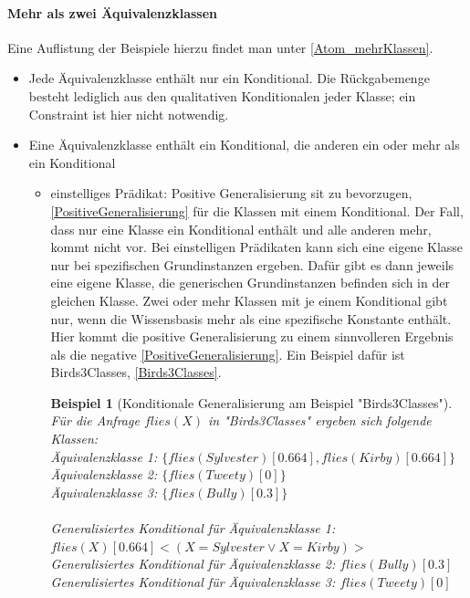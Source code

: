 \documentclass[a4paper, 11pt]{book}
\newtheorem{Bsp}{Beispiel}[section]
\begin{document}
\paragraph{ Mehr als zwei Äquivalenzklassen} 
Eine Auflistung der Beispiele hierzu findet man unter \ref{Atom_mehrKlassen}.\\
\begin{itemize}
	\item Jede Äquivalenzklasse enthält nur ein Konditional. Die Rückgabemenge besteht lediglich aus den qualitativen Konditionalen jeder Klasse; ein Constraint ist hier nicht notwendig.
	\item Eine Äquivalenzklasse enthält ein Konditional, die anderen ein oder mehr als ein Konditional
	\begin{itemize}
		\item einstelliges Prädikat: Positive Generalisierung sit zu bevorzugen, \ref{PositiveGeneralisierung} für die Klassen mit einem Konditional. Der Fall, dass nur eine Klasse ein Konditional enthält und alle anderen mehr, kommt nicht vor. Bei einstelligen Prädikaten kann sich eine eigene Klasse nur bei spezifischen Grundinstanzen ergeben. Dafür gibt es dann jeweils eine eigene Klasse, die generischen Grundinstanzen befinden sich in der gleichen Klasse. Zwei oder mehr Klassen mit je einem Konditional gibt nur, wenn die Wissensbasis mehr als eine spezifische Konstante enthält. Hier kommt die positive Generalisierung zu einem sinnvolleren Ergebnis als die negative \ref{PositiveGeneralisierung}. Ein Beispiel dafür ist Birds3Classes, \ref{Birds3Classes}.\\
		\begin{Bsp}[Konditionale Generalisierung am Beispiel "{}Birds3Classes"{}]
		Für die Anfrage $ flies(X) $ in "{}Birds3Classes"{} ergeben sich folgende Klassen:\\
		
		\noindent
		Äquivalenzklasse 1: $ \{flies(Sylvester)[0.664], flies(Kirby)[0.664]\}  $\\
		Äquivalenzklasse 2: $ \{flies(Tweety)[0]\} $\\
		Äquivalenzklasse 3: $ \{flies(Bully)[0.3]\} $\\
		\\
		Generalisiertes Konditional für Äquivalenzklasse 1: $ flies(X)[0.664]<(X = Sylvester \lor  X = Kirby)>$\\
		Generalisiertes Konditional für Äquivalenzklasse 2: $ flies(Bully)[0.3] $
		Generalisiertes Konditional für Äquivalenzklasse 3: $ flies(Tweety)[0] $\\
	

\end{Bsp}
\end{itemize}
\end{itemize}
\end{document}
